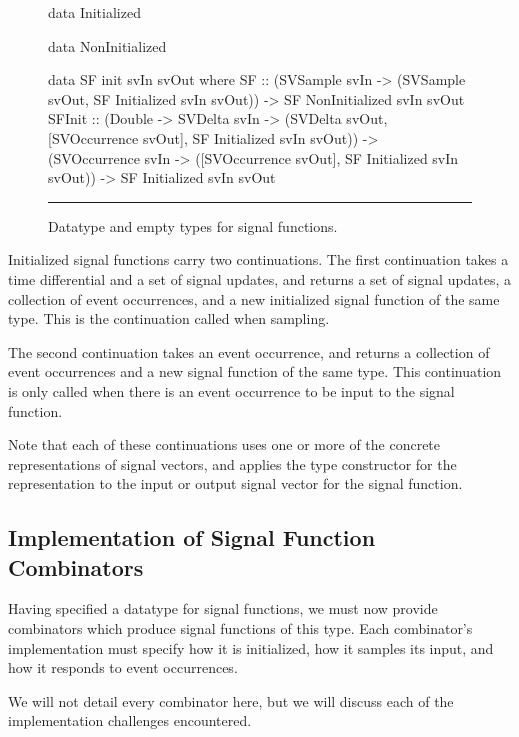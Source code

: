 \begin{figure}
\begin{code}
data Initialized

data NonInitialized

data SF init svIn svOut where
  SF     ::    (SVSample svIn 
                  -> (SVSample svOut,
                      SF Initialized svIn svOut)) 
            -> SF NonInitialized svIn svOut
  SFInit ::    (Double 
                  -> SVDelta svIn
                  -> (SVDelta svOut,
                      [SVOccurrence svOut],
                      SF Initialized svIn svOut)) 
            -> (SVOccurrence svIn
                  -> ([SVOccurrence svOut],
                      SF Initialized svIn svOut))
            -> SF Initialized svIn svOut
\end{code}
\hrule
\caption{Datatype and empty types for signal functions.}
\label{figure:signal_function_datatype}
\end{figure}

Initialized signal functions carry two continuations. The first continuation
takes a time differential and a set of signal updates, and returns a set of
signal updates, a collection of event occurrences, and a new initialized signal
function of the same type. This is the continuation called when sampling.

The second continuation takes an event occurrence, and returns a collection of
event occurrences and a new signal function of the same type. This continuation
is only called when there is an event occurrence to be input to the signal
function.

Note that each of these continuations uses one or more of the concrete
representations of signal vectors, and applies the type constructor for the
representation to the input or output signal vector for the signal function.

\subsection{Implementation of Signal Function Combinators}
\label{subsection:Implementation-Signal_Functions-Implementation_of_Signal_Function_Combinators}

Having specified a datatype for signal functions, we must now provide
combinators which produce signal functions of this type. Each combinator's
implementation must specify how it is initialized, how it samples its input, and
how it responds to event occurrences.

We will not detail every combinator here, but we will discuss each of the
implementation challenges encountered.

